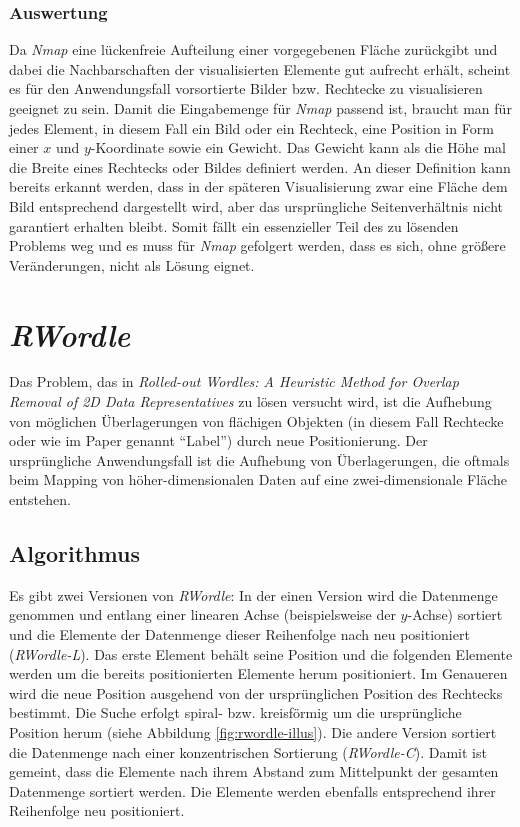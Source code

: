 \documentclass[12pt, ngerman, utf8]{article}
\begin{document}
\subsubsection{Auswertung}
Da \emph{Nmap} eine lückenfreie Aufteilung einer vorgegebenen Fläche zurückgibt und dabei die Nachbarschaften der visualisierten Elemente gut aufrecht erhält, scheint es für den Anwendungsfall vorsortierte Bilder bzw. Rechtecke zu visualisieren geeignet zu sein. Damit die Eingabemenge für \emph{Nmap} passend ist, braucht man für jedes Element, in diesem Fall ein Bild oder ein Rechteck, eine Position in Form einer $x$ und $y$-Koordinate sowie ein Gewicht. Das Gewicht kann als die Höhe mal die Breite eines Rechtecks oder Bildes definiert werden. An dieser Definition kann bereits erkannt werden, dass in der späteren Visualisierung zwar eine Fläche dem Bild entsprechend dargestellt wird, aber das ursprüngliche Seitenverhältnis nicht garantiert erhalten bleibt. Somit fällt ein essenzieller Teil des zu lösenden Problems weg und es muss für \emph{Nmap} gefolgert werden, dass es sich, ohne größere Veränderungen, nicht als Lösung eignet.

\section{\textit{RWordle}}\label{sec:rwordle}
Das Problem, das in \emph{Rolled-out Wordles: A Heuristic Method for Overlap Removal of 2D Data Representatives} \cite{rwordle} zu lösen versucht wird, ist die Aufhebung von möglichen Überlagerungen von flächigen Objekten (in diesem Fall Rechtecke oder wie im Paper genannt ``Label'') durch neue Positionierung. Der ursprüngliche Anwendungsfall ist die Aufhebung von Überlagerungen, die oftmals beim Mapping von höher-dimensionalen Daten auf eine zwei-dimensionale Fläche entstehen.

\subsection{Algorithmus}
Es gibt zwei Versionen von \emph{RWordle}: In der einen Version wird die Datenmenge genommen und entlang einer linearen Achse (beispielsweise der $y$-Achse) sortiert und die Elemente der Datenmenge dieser Reihenfolge nach neu positioniert (\emph{RWordle-L}). Das erste Element behält seine Position und die folgenden Elemente werden um die bereits positionierten Elemente herum positioniert. Im Genaueren wird die neue Position ausgehend von der ursprünglichen Position des Rechtecks bestimmt. Die Suche erfolgt spiral- bzw. kreisförmig um die ursprüngliche Position herum (siehe Abbildung \ref{fig:rwordle-illus}). Die andere Version sortiert die Datenmenge nach einer konzentrischen Sortierung (\emph{RWordle-C}). Damit ist gemeint, dass die Elemente nach ihrem Abstand zum Mittelpunkt der gesamten Datenmenge sortiert werden. Die Elemente werden ebenfalls entsprechend ihrer Reihenfolge neu positioniert. 
\end{document}

